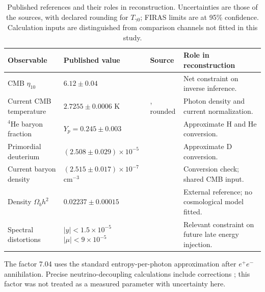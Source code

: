 \begin{table}[t]
\centering\small
\caption{Published references and their roles in reconstruction. Uncertainties are those of the sources, with declared rounding for $T_{\gamma0}$; FIRAS limits are at 95\% confidence. Calculation inputs are distinguished from comparison channels not fitted in this study.}
\label{tab:external}
\setlength{\tabcolsep}{5pt}\renewcommand{\arraystretch}{1.15}
\begin{tabular}{>{\raggedright\arraybackslash}p{}>{\raggedright\arraybackslash}p{}>{\raggedright\arraybackslash}p{}>{\raggedright\arraybackslash}p{}}\toprule
Observable & Published value & Source & Role in reconstruction\\\midrule
CMB $\eta_{10}$ & $6.12\pm0.04$ & \citet{Fields2025} & Net constraint on inverse inference.\\
Current CMB temperature & $2.7255\pm0.0006$ K & \citet{Fixsen2009}, rounded & Photon density and current normalization.\\
$^4$He baryon fraction & $Y_p=0.245\pm0.003$ & \citet{Fields2025} & Approximate H and He conversion.\\
Primordial deuterium & $(2.508\pm0.029)\times10^{-5}$ & \citet{Fields2025} & Approximate D conversion.\\
Current baryon density & $(2.515\pm0.017)\times10^{-7}$ cm$^{-3}$ & \citet{Groom2025} & Conversion check; shared CMB input.\\
Density $\Omega_bh^2$ & $0.02237\pm0.00015$ & \citet{Planck2020} & External reference; no cosmological model fitted.\\
Spectral distortions & $|y|<1.5\times10^{-5}$\newline $|\mu|<9\times10^{-5}$ & \citet{Fixsen1996} & Relevant constraint on future late energy injection.\\
\bottomrule\end{tabular}
\end{table}

The factor 7.04 uses the standard entropy-per-photon approximation after $e^+e^-$ annihilation. Precise neutrino-decoupling calculations include corrections \citep{Froustey2020}; this factor was not treated as a measured parameter with uncertainty here.


